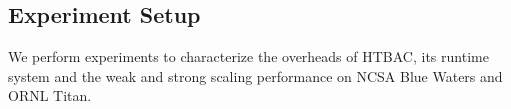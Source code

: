 
\subsection{Experiment Setup}\label{ssec:exp_design}

We perform experiments to characterize the overheads of HTBAC, its runtime
system and the weak and strong scaling performance on NCSA Blue Waters and 
ORNL Titan. 

